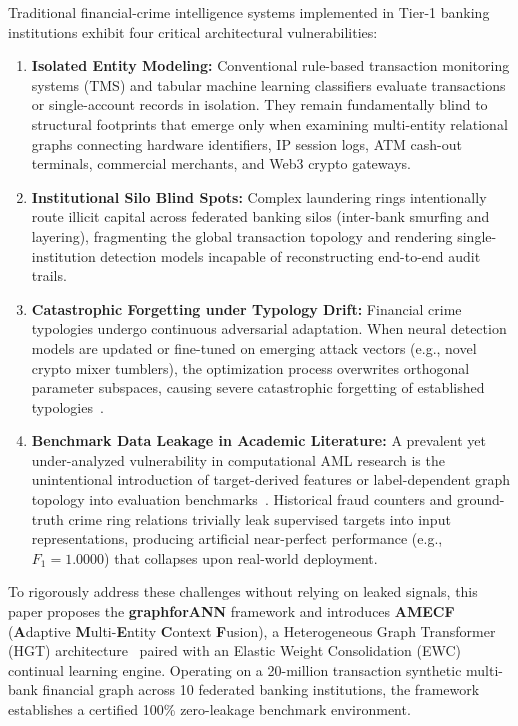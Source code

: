\documentclass[conference]{IEEEtran}
\begin{document}
Traditional financial-crime intelligence systems implemented in Tier-1 banking institutions exhibit four critical architectural vulnerabilities:
\begin{enumerate}
    \item \textbf{Isolated Entity Modeling:} Conventional rule-based transaction monitoring systems (TMS) and tabular machine learning classifiers evaluate transactions or single-account records in isolation. They remain fundamentally blind to structural footprints that emerge only when examining multi-entity relational graphs connecting hardware identifiers, IP session logs, ATM cash-out terminals, commercial merchants, and Web3 crypto gateways.
    \item \textbf{Institutional Silo Blind Spots:} Complex laundering rings intentionally route illicit capital across federated banking silos (inter-bank smurfing and layering), fragmenting the global transaction topology and rendering single-institution detection models incapable of reconstructing end-to-end audit trails.
    \item \textbf{Catastrophic Forgetting under Typology Drift:} Financial crime typologies undergo continuous adversarial adaptation. When neural detection models are updated or fine-tuned on emerging attack vectors (e.g., novel crypto mixer tumblers), the optimization process overwrites orthogonal parameter subspaces, causing severe catastrophic forgetting of established typologies~\cite{kirkpatrick2017overcoming,parisi2019continual}.
    \item \textbf{Benchmark Data Leakage in Academic Literature:} A prevalent yet under-analyzed vulnerability in computational AML research is the unintentional introduction of target-derived features or label-dependent graph topology into evaluation benchmarks~\cite{kaufman2012leakage,kapoor2023leakage}. Historical fraud counters and ground-truth crime ring relations trivially leak supervised targets into input representations, producing artificial near-perfect performance (e.g., $F_1 = 1.0000$) that collapses upon real-world deployment.
\end{enumerate}

To rigorously address these challenges without relying on leaked signals, this paper proposes the \textbf{graphforANN} framework and introduces \textbf{AMECF} (\textbf{A}daptive \textbf{M}ulti-\textbf{E}ntity \textbf{C}ontext \textbf{F}usion), a Heterogeneous Graph Transformer (HGT) architecture~\cite{hu2020heterogeneous} paired with an Elastic Weight Consolidation (EWC)~\cite{kirkpatrick2017overcoming} continual learning engine. Operating on a 20-million transaction synthetic multi-bank financial graph across 10 federated banking institutions, the framework establishes a certified 100\% zero-leakage benchmark environment.
\end{document}
